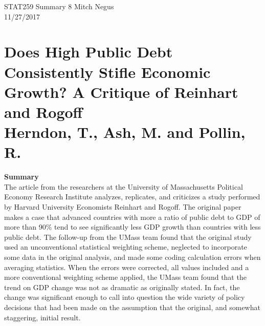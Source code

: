\documentclass{report}
\newcommand{\tab}{\-\hspace{1cm}}
\begin{document}
\thispagestyle{empty}
\sffamily

\large {STAT259 Summary {8} \hfill Mitch Negus\\
		\hspace*{\fill} 11/27/2017\\ }
\section*{\textsf{Does High Public Debt Consistently Stifle Economic
Growth?  A Critique of Reinhart and Rogoff \\ \normalsize Herndon, T., Ash, M. and Pollin, R.}}

\textbf{Summary}\\
\tab The article from the researchers at the University of Massachusetts Political Economy Research Institute analyzes, replicates, and criticizes a study performed by Harvard University Economists Reinhart and Rogoff. The original paper makes a case that advanced countries with more a ratio of public debt to GDP of more than 90\% tend to see significantly less GDP growth than countries with less public debt. The follow-up from the UMass team found that the original study used an unconventional statistical weighting scheme, neglected to incorporate some data in the original analysis, and made some coding calculation errors when averaging statistics. When the errors were corrected, all values included and a more conventional weighting scheme applied, the UMass team found that the trend on GDP change was not as dramatic as originally stated. In fact, the change was significant enough to call into question the wide variety of policy decisions that had been made on the assumption that the original, and somewhat staggering, initial result.
\end{document}
